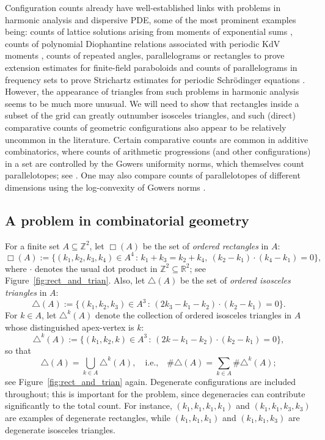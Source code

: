 \documentclass[11pt,reqno]{amsart}
\numberwithin{equation}{section}
\begin{document}
Configuration counts already have well-established links with problems in harmonic analysis and dispersive PDE, some of the most prominent examples being: 
counts of lattice solutions arising from moments of exponential sums \cite{B1},
counts of polynomial Diophantine relations associated with periodic KdV moments \cite{B2},
counts of repeated angles, parallelograms or rectangles to prove extension estimates for finite-field paraboloids \cite{RS18,IKL20,Lew20}
and counts of parallelograms in frequency sets to prove Strichartz estimates for periodic Schr\"{o}dinger equations \cite{HK,LZ25}. However, the appearance of triangles from such problems in harmonic analysis seems to be much more unusual.
We will need to show that rectangles inside a subset of the grid can greatly outnumber isosceles triangles, and such (direct) comparative counts of geometric configurations also appear to be relatively uncommon in the literature. Certain comparative counts are common in additive combinatorics, where counts of arithmetic progressions (and other configurations) in a set are controlled by the Gowers uniformity norms, which themselves count parallelotopes; see \cite{TV, THOFA}. One may also
compare counts of parallelotopes of different dimensions using the log-convexity of Gowers norms \cite{Shk14,Man17,BT24}.

\subsection{A problem in combinatorial geometry}
For a finite set $A\subseteq\mathbb{Z}^2$, let $\Box(A)$ be the set of \emph{ordered rectangles} in $A$:
\[ \Box(A) := \{(k_1,k_2,k_3,k_4)\in A^4 \,:\, k_1+k_3=k_2+k_4,\ (k_2-k_1)\cdot(k_4-k_1)=0 \}, \]
where $\cdot$ denotes the usual dot product in $\mathbb{Z}^2\subseteq\mathbb{R}^2$; see Figure~\ref{fig:rect_and_trian}.
Also, let $\triangle(A)$ be the set of \emph{ordered isosceles triangles} in $A$:
\[ \triangle(A) := \{(k_1,k_2,k_3)\in A^3 \,:\, (2k_3-k_1-k_2)\cdot(k_2-k_1)=0\}. \]
For $k\in A$, let $\triangle^k(A)$ denote the collection of ordered isosceles triangles in $A$ whose distinguished apex-vertex is $k$:
\[ \triangle^k(A) := \{(k_1,k_2,k)\in A^3 \,:\, (2k-k_1-k_2)\cdot(k_2-k_1)=0\}, \]
so that
\[ \triangle(A) = \bigcup_{k\in A} \triangle^k(A),\quad \text{i.e.,}\quad \#\triangle(A) = \sum_{k\in A} \#\triangle^k(A); \]
see Figure~\ref{fig:rect_and_trian} again.
Degenerate configurations are included throughout; this is important for the problem, since degeneracies can contribute significantly to the total count. For instance, $(k_1,k_1,k_1,k_1)$ and $(k_1,k_1,k_3,k_3)$ are examples of degenerate rectangles, while $(k_1,k_1,k_1)$ and $(k_1,k_1,k_3)$ are degenerate isosceles triangles.
\end{document}
